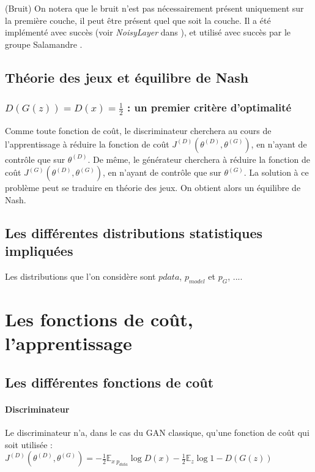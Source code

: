 \begin{remark}(Bruit)
On notera que le bruit n'est pas nécessairement présent uniquement sur la première couche, il peut être présent quel que soit la couche. Il a été implémenté avec succès (voir \textit{NoisyLayer} dans \cite{barrios_gan_2018}), et utilisé avec succès par le groupe Salamandre \cite{bouvier_dyvoire_dessine-moi_2018}.
\end{remark}
\subsection{Théorie des jeux et équilibre de Nash}
\subsubsection{$D(G(z)) = D(x) = \frac{1}{2}$ : un premier critère d'optimalité}
Comme toute fonction de coût, le discriminateur cherchera au cours de l'apprentissage à réduire la fonction de coût $J^{(D)}(\theta^{(D)}, \theta^{(G)})$, en n'ayant de contrôle que sur $\theta^{(D)}$. De même, le générateur cherchera à réduire la fonction de coût $J^{(G)}(\theta^{(D)}, \theta^{(G)})$, en n'ayant de contrôle que sur $\theta^{(G)}$. 
La solution à ce problème peut se traduire en théorie des jeux. On obtient alors un équilibre de Nash. 

\subsection{Les différentes distributions statistiques impliquées}
Les distributions que l'on considère sont $p{data}$, $p_{model}$ et $p_{G}$, ....

\section{Les fonctions de coût, l'apprentissage}

\subsection{Les différentes fonctions de coût}
\paragraph{Discriminateur}
Le discriminateur n'a, dans le cas du GAN classique, qu'une fonction de coût qui soit utilisée : \\
$J^{(D)}(\theta^{(D)}, \theta^{(G)}) = -\frac{1}{2}\mathbb{E}_{x~p_{data}}\log{D(x)}-\frac{1}{2}\mathbb{E}_{z}\log{1-D(G(z))}$ 

